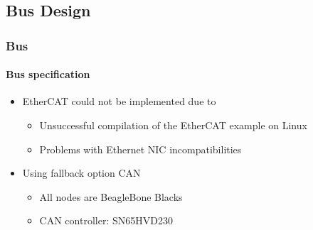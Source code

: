 \documentclass{beamer}
\begin{document}
%
%
%
%

\subsection{Bus Design}
\begin{frame}
  \frametitle{Bus}
  \framesubtitle{Bus specification}
  \begin{itemize}
    \item EtherCAT could not be implemented due to
		\begin{itemize}
			\item Unsuccessful compilation of the EtherCAT example on Linux
			\item Problems with Ethernet NIC incompatibilities
		\end{itemize}
		\vfill
    \item Using fallback option CAN
		\begin{itemize}
			\item All nodes are BeagleBone Blacks
			\item CAN controller: SN65HVD230
		\end{itemize}
  \end{itemize}
\end{frame}
\end{document}
